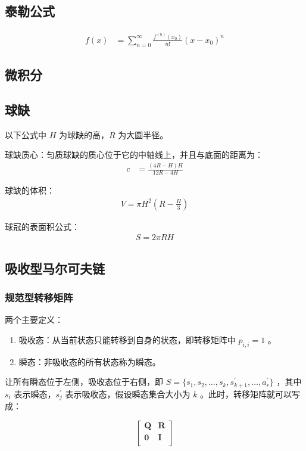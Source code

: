 \documentclass{article}
\begin{document}
\subsection{泰勒公式}
$$
\begin{aligned}
f(x)&=\sum_{n=0}^{\infty}{\frac{f^{(n)}(x_{0})}{n!}}(x-x_0)^n
\end{aligned}
$$
\subsection{微积分}

\subsection{球缺}

以下公式中 $H$ 为球缺的高，$R$ 为大圆半径。

球缺质心：匀质球缺的质心位于它的中轴线上，并且与底面的距离为：
$$
\begin{aligned}
c &= \frac{(4R-H)H}{12R-4H}
\end{aligned}
$$

球缺的体积：
$$
\begin{aligned}
V =\pi H^2(R-\frac{H}{3})
\end{aligned}
$$

球冠的表面积公式：
$$
\begin{aligned}
S =2\pi RH
\end{aligned}
$$

\subsection{吸收型马尔可夫链}
\subsubsection{规范型转移矩阵}
两个主要定义：

\begin{enumerate}
    \item 吸收态：从当前状态只能转移到自身的状态，即转移矩阵中 $p_{i,i}=1$ 。
    \item 瞬态：非吸收态的所有状态称为瞬态。
\end{enumerate}

让所有瞬态位于左侧，吸收态位于右侧，即 $S=\{s_1,s_2,\ldots,s_k,s^{\prime}_{k+1},\ldots, a^{\prime}_r\}$ ，其中 $s_i$ 表示瞬态，$s^{\prime}_j$ 表示吸收态，假设瞬态集合大小为 $k$ 。此时，转移矩阵就可以写成：

$$
\begin{bmatrix}
\textbf{Q} & \textbf{R}\\
\textbf{0} & \textbf{I}\\
\end{bmatrix}
$$
\end{document}

